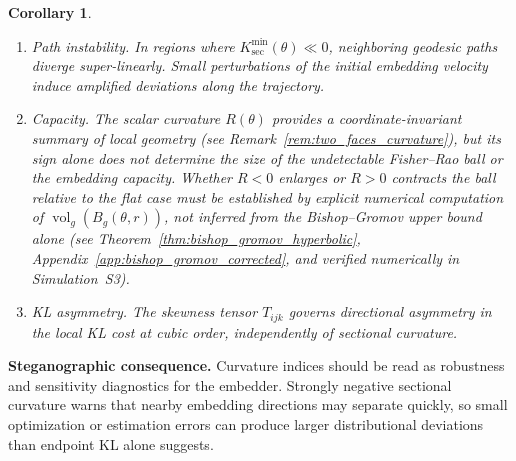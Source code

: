 \documentclass[a4paper,fleqn]{cas-dc}
\newtheorem{corollary}{Corollary}
\DeclareMathOperator{\vol}{vol}
\begin{document}
\begin{corollary}%
  \label{cor:curvature_instability}
  \begin{enumerate}
    \item[(i)] \emph{Path instability.}
          In regions where $K_{\sec}^{\min}(\theta)\ll 0$,
          neighboring geodesic paths diverge super-linearly.
          Small perturbations of the initial embedding velocity induce
          amplified deviations along the trajectory.
    \item[(ii)] \emph{Capacity.}
          The scalar curvature $R(\theta)$ provides a coordinate-invariant
          summary of local geometry (see Remark~\ref{rem:two_faces_curvature}),
          but its sign alone does \emph{not} determine the size of the
          undetectable Fisher--Rao ball or the embedding capacity.
          Whether $R<0$ enlarges or $R>0$ contracts the ball relative to
          the flat case must be established by explicit numerical computation
          of $\vol_g(B_g(\theta,r))$, not inferred from the Bishop--Gromov
          upper bound alone (see Theorem~\ref{thm:bishop_gromov_hyperbolic},
          Appendix~\ref{app:bishop_gromov_corrected}, and
          verified numerically in Simulation~S3).
    \item[(iii)] \emph{KL asymmetry.}
          The skewness tensor $T_{ijk}$ governs directional
          asymmetry in the local KL cost at cubic order, independently
          of sectional curvature.
  \end{enumerate}
\end{corollary}

\noindent\textbf{Steganographic consequence.}
Curvature indices should be read as robustness and sensitivity diagnostics for
the embedder. Strongly negative sectional curvature warns that nearby embedding
directions may separate quickly, so small optimization or estimation errors can
produce larger distributional deviations than endpoint KL alone suggests.
\end{document}
